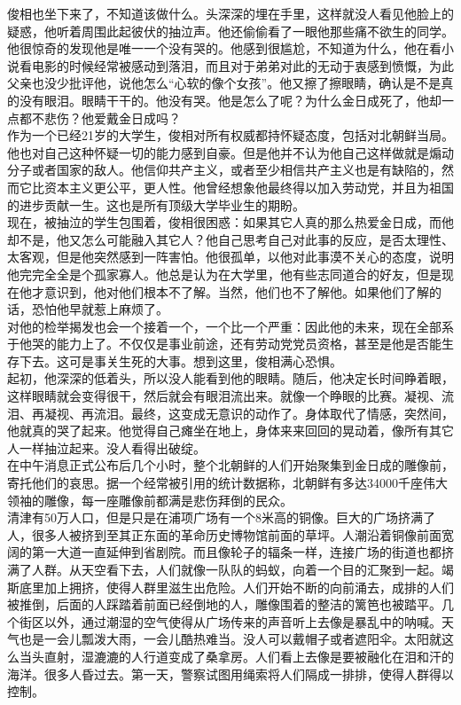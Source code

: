 俊相也坐下来了，不知道该做什么。头深深的埋在手里，这样就没人看见他脸上的疑惑，他听着周围此起彼伏的抽泣声。他还偷偷看了一眼他那些痛不欲生的同学。他很惊奇的发现他是唯一一个没有哭的。他感到很尴尬，不知道为什么，他在看小说看电影的时候经常被感动到落泪，而且对于弟弟对此的无动于衷感到愤慨，为此父亲也没少批评他，说他怎么“心软的像个女孩”。他又擦了擦眼睛，确认是不是真的没有眼泪。眼睛干干的。他没有哭。他是怎么了呢？为什么金日成死了，他却一点都不悲伤？他爱戴金日成吗？\\

作为一个已经21岁的大学生，俊相对所有权威都持怀疑态度，包括对北朝鲜当局。他也对自己这种怀疑一切的能力感到自豪。但是他并不认为他自己这样做就是煽动分子或者国家的敌人。他信仰共产主义，或者至少相信共产主义也是有缺陷的，然而它比资本主义更公平，更人性。他曾经想象他最终得以加入劳动党，并且为祖国的进步贡献一生。这也是所有顶级大学毕业生的期盼。\\

现在，被抽泣的学生包围着，俊相很困惑：如果其它人真的那么热爱金日成，而他却不是，他又怎么可能融入其它人？他自己思考自己对此事的反应，是否太理性、太客观，但是他突然感到一阵害怕。他很孤单，以他对此事漠不关心的态度，说明他完完全全是个孤家寡人。他总是认为在大学里，他有些志同道合的好友，但是现在他才意识到，他对他们根本不了解。当然，他们也不了解他。如果他们了解的话，恐怕他早就惹上麻烦了。\\

对他的检举揭发也会一个接着一个，一个比一个严重：因此他的未来，现在全部系于他哭的能力上了。不仅仅是事业前途，还有劳动党党员资格，甚至是他是否能生存下去。这可是事关生死的大事。想到这里，俊相满心恐惧。\\

起初，他深深的低着头，所以没人能看到他的眼睛。随后，他决定长时间睁着眼，这样眼睛就会变得很干，然后就会有眼泪流出来。就像一个睁眼的比赛。凝视、流泪、再凝视、再流泪。最终，这变成无意识的动作了。身体取代了情感，突然间，他就真的哭了起来。他觉得自己瘫坐在地上，身体来来回回的晃动着，像所有其它人一样抽泣起来。没人看得出破绽。\\

在中午消息正式公布后几个小时，整个北朝鲜的人们开始聚集到金日成的雕像前，寄托他们的哀思。据一个经常被引用的统计数据称，北朝鲜有多达34000千座伟大领袖的雕像，每一座雕像前都满是悲伤拜倒的民众。\\

清津有50万人口，但是只是在浦项广场有一个8米高的铜像。巨大的广场挤满了人，很多人被挤到至其正东面的革命历史博物馆前面的草坪。人潮沿着铜像前面宽阔的第一大道一直延伸到省剧院。而且像轮子的辐条一样，连接广场的街道也都挤满了人群。从天空看下去，人们就像一队队的蚂蚁，向着一个目的汇聚到一起。竭斯底里加上拥挤，使得人群里滋生出危险。人们开始不断的向前涌去，成排的人们被推倒，后面的人踩踏着前面已经倒地的人，雕像围着的整洁的篱笆也被踏平。几个街区以外，通过潮湿的空气使得从广场传来的声音听上去像是暴乱中的呐喊。天气也是一会儿瓢泼大雨，一会儿酷热难当。没人可以戴帽子或者遮阳伞。太阳就这么当头直射，湿漉漉的人行道变成了桑拿房。人们看上去像是要被融化在泪和汗的海洋。很多人昏过去。第一天，警察试图用绳索将人们隔成一排排，使得人群得以控制。\\

